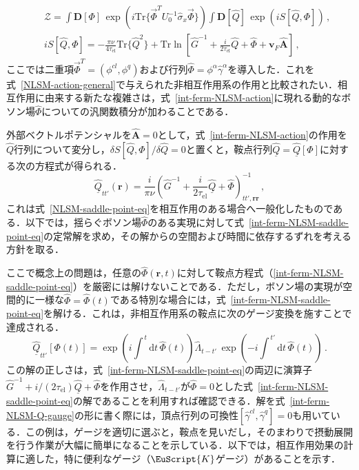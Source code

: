 \documentclass[a4paper,11pt]{ltjsarticle}
\def\Tr{\mathrm{Tr}}
\def\d{\mathrm{d}}
\def\D{\mathbf{D}}
\def\rt{(\mathbf{r},t)}
\def\tauel{\tau_{\mathrm{el}}}
\begin{document}
\begin{eqnarray}\label{int-ferm-NLSM-action}
&&\mathcal{Z}=\int\D[\Phi]\,\exp
\left(i\Tr\{\vec{\Phi}^{T}U^{-1}_{0}\hat{\sigma}_{x}\vec{\Phi}\}\right)
\int\D[\hat Q]\,\exp\left(iS[\hat Q,\Phi]\right)\,,\nonumber\\
&&iS[\hat Q,\Phi]=-\frac{\pi\nu}{4\tauel}\Tr\{\hat{Q}^{2}\}+
\Tr\ln\left[\hat{G}^{-1}+\frac{i}{2\tauel}\hat{Q}+
\hat{\Phi}+\mathbf{v}_{F}\hat{\mathbf{A}}\right]\,,
\end{eqnarray}
ここでは二重項$\vec{\Phi}^{T}=(\phi^{cl},\phi^{q})$および行列$\hat{\Phi}=\phi^{\alpha}\hat{\gamma}^{\alpha}$を導入した．これを式~\eqref{NLSM-action-general}で与えられた非相互作用系の作用と比較されたい．相互作用に由来する新たな複雑さは，式~\eqref{int-ferm-NLSM-action}に現れる動的なボソン場$\hat{\Phi}$についての汎関数積分が加わることである．

外部ベクトルポテンシャルを$\hat{\mathbf{A}}=0$として，式~\eqref{int-ferm-NLSM-action}の作用を$\hat Q$行列について変分し，$\delta S[\hat Q,\Phi]/\delta \hat{Q}=0$と置くと，鞍点行列$\underline{\hat{Q}}=\underline{\hat{Q}}[\Phi]$に対する次の方程式が得られる．
\begin{equation}\label{int-ferm-NLSM-saddle-point-eq}
\underline{\hat{Q}}_{tt'}(\mathbf{r})= \frac{i}{\pi\nu}
\left(\hat{G}^{-1}+\frac{i}{2\tauel}\underline{\hat{Q}}+
\hat{\Phi}\right)^{-1}_{tt',\mathbf{r}\mathbf{r}} \,,
\end{equation}
これは式~\eqref{NLSM-saddle-point-eq}を相互作用のある場合へ一般化したものである．以下では，揺らぐボソン場$\hat{\Phi}$のある実現に対して式~\eqref{int-ferm-NLSM-saddle-point-eq}の定常解を求め，その解からの空間および時間に依存するずれを考える方針を取る．

ここで概念上の問題は，任意の$\hat{\Phi}\rt$に対して鞍点方程式（\ref{int-ferm-NLSM-saddle-point-eq}）を厳密には解けないことである．ただし，ボソン場の実現が空間的に一様な$\hat{\Phi}=\hat{\Phi}(t)$である特別な場合には，式~\eqref{int-ferm-NLSM-saddle-point-eq}を解ける．これは，非相互作用系の鞍点に次のゲージ変換を施すことで達成される．
\begin{equation}\label{int-ferm-NLSM-Q-gauge}
\underline{\hat{Q}}_{tt'}[\Phi(t)]=\exp\left(i\int^{\,t}\d
t\,\hat{\Phi}(t)\right)
\hat{\Lambda}_{t-t'}\,\exp\left(-i\int^{\,t'}\d
t\,\hat{\Phi}(t)\right)\,.
\end{equation}
この解の正しさは，式~\eqref{int-ferm-NLSM-saddle-point-eq}の両辺に演算子$\hat{G}^{-1}+i/(2\tauel)\underline{\hat{Q}}+\hat{\Phi}$を作用させ，$\hat{\Lambda}_{t-t'}$が$\hat{\Phi}=0$とした式~\eqref{int-ferm-NLSM-saddle-point-eq}の解であることを利用すれば確認できる．解を式~\eqref{int-ferm-NLSM-Q-gauge}の形に書く際には，頂点行列の可換性$[\hat{\gamma}^{cl},\hat{\gamma}^{q}]=0$も用いている．この例は，ゲージを適切に選ぶと，鞍点を見いだし，そのまわりで摂動展開を行う作業が大幅に簡単になることを示している．以下では，相互作用効果の計算に適した，特に便利なゲージ（$\EuScript{K}$ゲージ）があることを示す．
\end{document}
